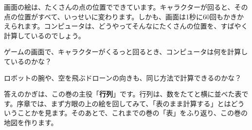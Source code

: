 画面の絵は、たくさんの点の位置でできています。キャラクターが回ると、その点の位置がすべて、いっせいに変わります。しかも、画面は1秒に60回もかきかえられます。コンピュータは、どうやってそんなにたくさんの位置を、すばやく計算しているのでしょう。

\begin{hatena}
\par\addvspace{4pt}\noindent\begin{minipage}[c]{0.58\linewidth}
ゲームの画面で、キャラクターがくるっと回るとき、コンピュータは何を計算しているのかな？\par\vspace{3pt}
ロボットの腕や、空を飛ぶドローンの向きも、同じ方法で計算できるのかな？
\end{minipage}\hfill
\begin{minipage}[c]{0.38\linewidth}\centering
{}
\end{minipage}
\end{hatena}

答えのかぎは、この巻の主役「\textbf{行列}」です。行列は、数をたてと横に並べた表です。序章では、まず方眼の上の絵を回してみて、「表のまま計算する」とはどういうことかを見ます。そのあとで、これまでの巻の「表」をふり返り、この巻の地図を作ります。

\begin{omoidasou}
\end{omoidasou}


